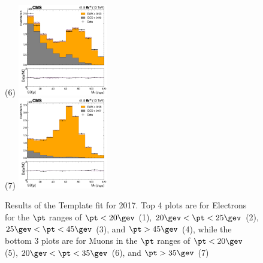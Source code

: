 \begin{figure}
  \subfigure(6) \includegraphics[width=0.35\textwidth]{template_fit/2017/mt_high_Muon_20.0.png} \\
  \subfigure(7) \includegraphics[width=0.35\textwidth]{template_fit/2017/mt_high_Muon_35.0.png}
  \caption{Results of the Template fit for 2017. Top 4 plots are for Electrons for the $\pt$ ranges of $\pt < 20\gev$ (1), $20\gev<\pt<25\gev$ (2), $25\gev<\pt<45\gev$ (3), and $\pt>45\gev$ (4), while the bottom 3 plots are for Muons in the $\pt$ ranges of $\pt < 20\gev$ (5), $20\gev<\pt<35\gev$ (6), and $\pt>35\gev$ (7)}
\end{figure}

